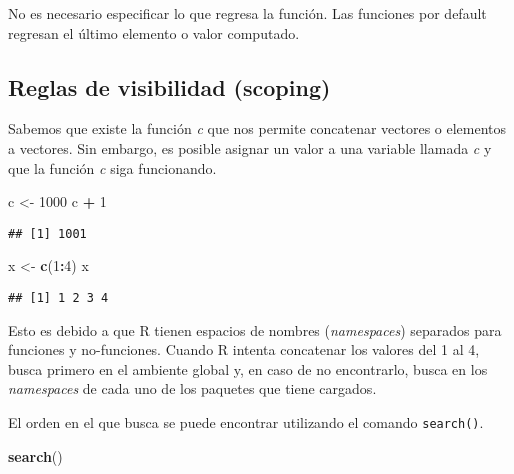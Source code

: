 \documentclass[]{article}
\newenvironment{Shaded}{\begin{snugshade}}{\end{snugshade}}
\newcommand{\KeywordTok}[1]{\textcolor[rgb]{0.13,0.29,0.53}{\textbf{#1}}}
\newcommand{\DecValTok}[1]{\textcolor[rgb]{0.00,0.00,0.81}{#1}}
\newcommand{\StringTok}[1]{\textcolor[rgb]{0.31,0.60,0.02}{#1}}
\newcommand{\OperatorTok}[1]{\textcolor[rgb]{0.81,0.36,0.00}{\textbf{#1}}}
\newcommand{\NormalTok}[1]{#1}
\begin{document}
\begin{curiosidad}[Return]
No es necesario especificar lo que regresa la función. Las funciones por
default regresan el último elemento o valor computado.
\end{curiosidad}

\subsection{Reglas de visibilidad
(scoping)}\label{reglas-de-visibilidad-scoping}

Sabemos que existe la función \emph{c} que nos permite concatenar
vectores o elementos a vectores. Sin embargo, es posible asignar un
valor a una variable llamada \emph{c} y que la función \emph{c} siga
funcionando.

\begin{Shaded}
\begin{Highlighting}[]
\NormalTok{c <-}\StringTok{ }\DecValTok{1000}
\NormalTok{c }\OperatorTok{+}\StringTok{ }\DecValTok{1}
\end{Highlighting}
\end{Shaded}

\begin{verbatim}
## [1] 1001
\end{verbatim}

\begin{Shaded}
\begin{Highlighting}[]
\NormalTok{x <-}\StringTok{ }\KeywordTok{c}\NormalTok{(}\DecValTok{1}\OperatorTok{:}\DecValTok{4}\NormalTok{)}
\NormalTok{x}
\end{Highlighting}
\end{Shaded}

\begin{verbatim}
## [1] 1 2 3 4
\end{verbatim}

Esto es debido a que R tienen espacios de nombres (\emph{namespaces})
separados para funciones y no-funciones. Cuando R intenta concatenar los
valores del 1 al 4, busca primero en el ambiente global y, en caso de no
encontrarlo, busca en los \emph{namespaces} de cada uno de los paquetes
que tiene cargados.

El orden en el que busca se puede encontrar utilizando el comando
\texttt{search()}.

\begin{Shaded}
\begin{Highlighting}[]
\KeywordTok{search}\NormalTok{()}
\end{Highlighting}
\end{Shaded}
\end{document}
